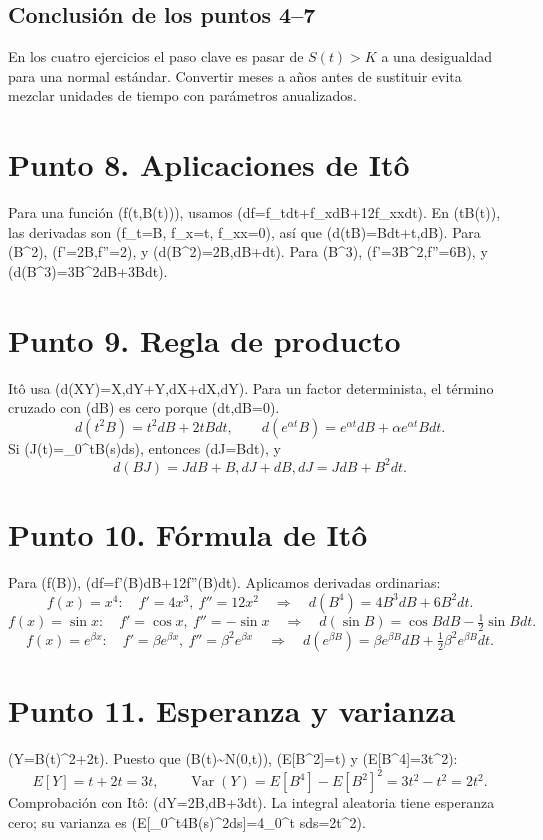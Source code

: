 \documentclass[11pt,a4paper]{article}
\begin{document}
\subsection*{Conclusión de los puntos 4--7}
En los cuatro ejercicios el paso clave es pasar de \(S(t)>K\) a una desigualdad para una normal estándar. Convertir meses a años antes de sustituir evita mezclar unidades de tiempo con parámetros anualizados.

\section*{Punto 8. Aplicaciones de Itô}
Para una función (f(t,B(t))), usamos (df=f_tdt+f_xdB+\tfrac12f_{xx}dt). En (tB(t)), las derivadas son (f_t=B, f_x=t, f_{xx}=0), así que (d(tB)=Bdt+t,dB). Para (B^2), (f'=2B,f''=2), y (d(B^2)=2B,dB+dt). Para (B^3), (f'=3B^2,f''=6B), y (d(B^3)=3B^2dB+3Bdt).

\section*{Punto 9. Regla de producto}
Itô usa (d(XY)=X,dY+Y,dX+dX,dY). Para un factor determinista, el término cruzado con (dB) es cero porque (dt,dB=0).
\[
d(t^2B)=t^2dB+2tBdt,\qquad d(e^{\alpha t}B)=e^{\alpha t}dB+\alpha e^{\alpha t}Bdt.
\]
Si (J(t)=\int_0^tB(s)ds), entonces (dJ=Bdt), y
\[
d(BJ)=JdB+B,dJ+dB,dJ=JdB+B^2dt.
\]

\section*{Punto 10. Fórmula de Itô}
Para (f(B)), (df=f'(B)dB+\tfrac12f''(B)dt). Aplicamos derivadas ordinarias:
\[
f(x)=x^4:\quad f'=4x^3,\ f''=12x^2\quad\Longrightarrow\quad d(B^4)=4B^3dB+6B^2dt.
\]
\[
f(x)=\sin x:\quad f'=\cos x,\ f''=-\sin x\quad\Longrightarrow\quad d(\sin B)=\cos BdB-\tfrac12\sin Bdt.
\]
\[
f(x)=e^{\beta x}:\quad f'=\beta e^{\beta x},\ f''=\beta^2e^{\beta x}\quad\Longrightarrow\quad d(e^{\beta B})=\beta e^{\beta B}dB+\tfrac12\beta^2e^{\beta B}dt.
\]

\section*{Punto 11. Esperanza y varianza}
(Y=B(t)^2+2t). Puesto que (B(t)\sim N(0,t)), (E[B^2]=t) y (E[B^4]=3t^2):
\[
E[Y]=t+2t=3t,\qquad \operatorname{Var}(Y)=E[B^4]-E[B^2]^2=3t^2-t^2=2t^2.
\]
Comprobación con Itô: (dY=2B,dB+3dt). La integral aleatoria tiene esperanza cero; su varianza es (E[\int_0^t4B(s)^2ds]=4\int_0^t sds=2t^2).
\end{document}
